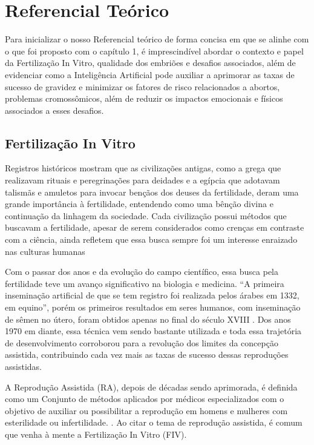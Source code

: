\chapter[Referencial Teórico]{Referencial Teórico}

Para inicializar o nosso Referencial teórico de forma concisa em que se alinhe com o que foi proposto com o capítulo 1, é imprescindível abordar o contexto e papel da Fertilização In Vitro, qualidade dos embriões e desafios associados, além de evidenciar como a Inteligência Artificial pode auxiliar a aprimorar as taxas de sucesso de gravidez e minimizar os fatores de risco relacionados a abortos, problemas cromossômicos, além de reduzir os impactos emocionais e físicos associados a esses desafios.

\section{Fertilização In Vitro}

Registros históricos mostram que as civilizações antigas, como a grega que realizavam rituais e peregrinações para deidades e a egípcia que adotavam talismãs e amuletos para invocar bençãos dos deuses da fertilidade, deram uma grande importância à fertilidade, entendendo como uma bênção divina e continuação da linhagem da sociedade. Cada civilização possui métodos que buscavam a fertilidade, apesar de serem considerados como crenças em contraste com a ciência, ainda refletem que essa busca sempre foi um interesse enraizado nas culturas humanas \cite{moura2020}

Com o passar dos anos e da evolução do campo científico, essa busca pela fertilidade teve um avanço significativo na biologia e medicina. “A primeira inseminação artificial de que se tem registro foi realizada pelos árabes em 1332, em equino”, porém os primeiros resultados em seres humanos, com inseminação de sêmen no útero, foram obtidos apenas no final do século XVIII \cite{moura2020}. Dos anos 1970 em diante, essa técnica vem sendo bastante utilizada e toda essa trajetória de desenvolvimento corroborou para a revolução dos limites da concepção assistida, contribuindo cada vez mais as taxas de sucesso dessas reproduções assistidas.

A Reprodução Assistida (RA), depois de décadas sendo aprimorada, é definida como um Conjunto de métodos aplicados por médicos especializados com o objetivo de auxiliar ou possibilitar a reprodução em homens e mulheres com esterilidade ou infertilidade. \cite{souzamarise2024}. Ao citar o tema de reprodução assistida, é comum que venha à mente a Fertilização In Vitro (FIV).

